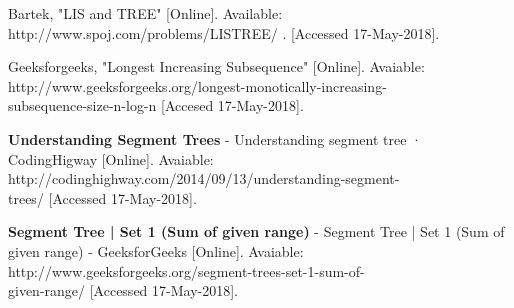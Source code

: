 \documentclass[a4paper]{IEEEtran}
\begin{document}
\begin{thebibliography}{9}
	Bartek, "LIS and TREE" [Online]. Available: http://www.spoj.com/problems/LISTREE/ . [Accessed 17-May-2018].
	 
	Geeksforgeeks, "Longest Increasing Subsequence" [Online]. Avaiable: http://www.geeksforgeeks.org/longest-monotically-increasing-\\subsequence-size-n-log-n [Accesed 17-May-2018].
	
	\textbf{Understanding Segment Trees} - Understanding segment tree · CodingHigway [Online]. Avaiable: http://codinghighway.com/2014/09/13/understanding-segment-\\trees/ [Accessed 17-May-2018].
	
	\textbf{Segment Tree | Set 1 (Sum of given range)} - Segment Tree | Set 1 (Sum of given range) - GeeksforGeeks [Online]. Avaiable: http://www.geeksforgeeks.org/segment-trees-set-1-sum-of-\\given-range/ [Accessed 17-May-2018].
		
\end{thebibliography}
\end{document}
